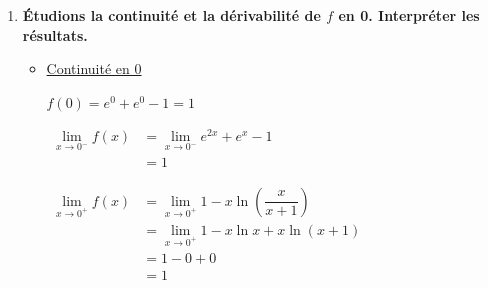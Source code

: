\documentclass[12pt,a4paper]{article}
\begin{document}
\begin{enumerate}
    \begin{itemize}
        \item .\\
     		$\begin{aligned}
     		1 + \dfrac{\ln\left(\frac{x}{x+1}\right)}{\frac{x}{x+1}-1}\left(\dfrac{x}{x+1}\right) &= 1 + \dfrac{\ln\left(\frac{x}{x+1}\right)}{\frac{-1}{x+1}}\left(\dfrac{x}{x+1}\right) \\
     		&= 1 - \ln\left(\dfrac{x}{x+1}\right)(x+1)\left(\dfrac{x}{x+1}\right) \\
     		&= 1 - x\ln\left(\dfrac{x}{x+1}\right)
        \end{aligned}$   		   
         \hfill \textcolor{red}{0,25pt}
        
        \item $
        \begin{aligned}
        \lim\limits_{x \to +\infty} f(x) &= \lim\limits_{x \to +\infty} 1 + \dfrac{\ln\left(\frac{x}{x+1}\right)}{\frac{x}{x+1}-1}\left(\dfrac{x}{x+1}\right)\\ 
        &= 1 + 1 \times 1 \\
        &= 2
        \end{aligned}$ 
        
        Donc \colorbox{green}{$\lim\limits_{x \to +\infty} f(x) = 2$} \hfill \textcolor{red}{0,25pt}
        
        \item On a une \colorbox{green}{asymptote horizontale d'équation $y = 2$ en $+\infty$} \hfill \textcolor{red}{0,25pt}
    \end{itemize}

    \item \textbf{Étudions la continuité et la dérivabilité de $f$ en 0. Interpréter les résultats.}
    \begin{itemize}
        \item \underline{Continuité en 0}
        
        $f(0) = e^0 + e^0 - 1 = 1$
        
        $
        \begin{aligned}
        \lim\limits_{x \to 0^-} f(x) &= \lim\limits_{x \to 0^-} e^{2x} + e^x - 1\\ 
        &= 1
        \end{aligned}$
        
        $
        \begin{aligned}
        \lim\limits_{x \to 0^+} f(x) &= \lim\limits_{x \to 0^+} 1 - x\ln\left(\dfrac{x}{x+1}\right) \\
        &= \lim\limits_{x \to 0^+} 1 - x\ln x + x\ln(x+1)\\ 
        &= 1 - 0 + 0\\
        & = 1
        \end{aligned}$
        

\end{itemize}
\end{enumerate}
\end{document}
